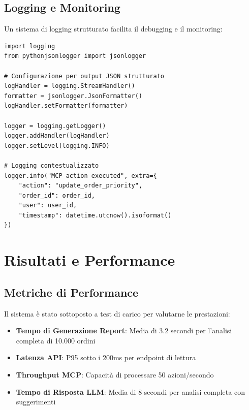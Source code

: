 \subsection{Logging e Monitoring}
Un sistema di logging strutturato facilita il debugging e il monitoring:

\begin{listing}[H]
\begin{verbatim}
import logging
from pythonjsonlogger import jsonlogger

# Configurazione per output JSON strutturato
logHandler = logging.StreamHandler()
formatter = jsonlogger.JsonFormatter()
logHandler.setFormatter(formatter)

logger = logging.getLogger()
logger.addHandler(logHandler)
logger.setLevel(logging.INFO)

# Logging contestualizzato
logger.info("MCP action executed", extra={
    "action": "update_order_priority",
    "order_id": order_id,
    "user": user_id,
    "timestamp": datetime.utcnow().isoformat()
})
\end{verbatim}
\caption{Configurazione del logging centralizzato}
\label{listing:logging-config}
\end{listing}

\section{Risultati e Performance}
\label{sec:results_performance}

\subsection{Metriche di Performance}
Il sistema è stato sottoposto a test di carico per valutarne le prestazioni:

\begin{itemize}
    \item \textbf{Tempo di Generazione Report}: Media di 3.2 secondi per l'analisi completa di 10.000 ordini
    \item \textbf{Latenza API}: P95 sotto i 200ms per endpoint di lettura
    \item \textbf{Throughput MCP}: Capacità di processare 50 azioni/secondo
    \item \textbf{Tempo di Risposta LLM}: Media di 8 secondi per analisi completa con suggerimenti
\end{itemize}

